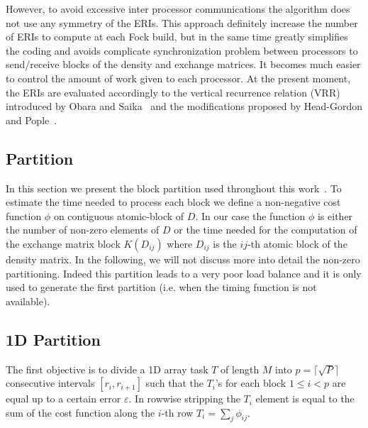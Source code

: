 \documentclass[twocolumn,showkeys,showpacs,preprintnumbers,amsmath,amssymb]{revtex4}
\begin{document}
 However, to avoid excessive inter processor communications the algorithm 
 does not use any symmetry of the ERIs. This approach
 definitely increase the number of ERIs to compute at each Fock build,
 but in the same time greatly simplifies the coding and avoids complicate
 synchronization problem between processors to send/receive blocks of the 
 density and exchange matrices. It becomes much 
 easier to control the amount of work given to each processor.
 At the present moment, the ERIs are evaluated accordingly to
 the vertical recurrence relation (VRR) introduced by Obara 
 and Saika~\cite{SObara86} and the modifications proposed by Head-Gordon
 and Pople~\cite{MGordon88}.


\subsection{Partition}
 In this section we present the block partition used
 throughout this work~\cite{APinar97,LRomero95}. 
 To estimate the time needed to process each block we define
 a non-negative cost function $\phi$ on contiguous atomic-block of
 $D$. In our case the function $\phi$ is either the number of 
 non-zero elements of $D$ or the time needed for the computation
 of the exchange matrix block $K(D_{ij})$ where $D_{ij}$ is the
 $ij$-th atomic block of the density matrix. In the following, 
 we will not discuss more into detail the non-zero partitioning.
 Indeed this partition leads to a very poor load balance and it is
 only used to generate the first partition (i.e. when 
 the timing function is not available). 

\subsection{1D Partition}
 The first objective is to divide a 1D array task $T$ of length $M$
 into $p=\lceil\sqrt{P}\rceil$ consecutive intervals $[r_i,r_{i+1}]$ such
 that the $T_i$'s for
 each block $1 \le i < p$ are equal up to a certain error
 $\varepsilon$. In rowwise stripping the $T_i$ element is equal
 to the sum of the cost function along the $i$-th row 
 $T_i=\sum_j\phi_{ij}$. 
\end{document}
